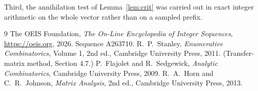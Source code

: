 \documentclass[11pt,a4paper]{article}
\theoremstyle{plain}
\theoremstyle{definition}
\begin{document}
Third, the annihilation test of Lemma~\ref{lem:crit} was carried out in exact integer
arithmetic on the whole vector rather than on a sampled prefix.

\begin{thebibliography}{9}
 The OEIS Foundation, \emph{The On-Line Encyclopedia of Integer
Sequences}, \url{https://oeis.org}, 2026. Sequence A263710.
 R.~P.~Stanley, \emph{Enumerative Combinatorics}, Volume 1, 2nd ed.,
Cambridge University Press, 2011. (Transfer-matrix method, Section 4.7.)
 P.~Flajolet and R.~Sedgewick, \emph{Analytic Combinatorics}, Cambridge
University Press, 2009.
 R.~A.~Horn and C.~R.~Johnson, \emph{Matrix Analysis}, 2nd ed., Cambridge
University Press, 2013.
\end{thebibliography}
\end{document}
